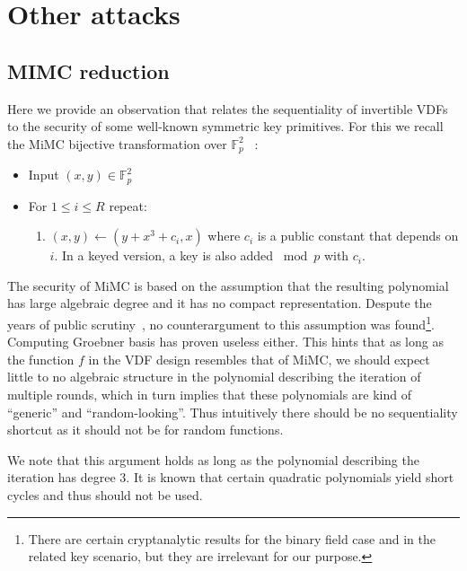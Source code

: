\documentclass{article}
\begin{document}


\section{Other attacks}


\subsection{MIMC reduction}

Here we provide an observation that relates the sequentiality of invertible VDFs to the security of some well-known symmetric key primitives. For this we recall the MiMC bijective transformation over $\mathbb{F}_p^2$ ~\cite{DBLP:conf/asiacrypt/Albrecht0R0T16}:
\begin{itemize}
\item Input $(x,y)\in\mathbb{F}_p^2$
    \item For $1\leq i \leq R$ repeat:
    \begin{enumerate}
        \item $(x,y)\leftarrow (y+x^3+c_i,x)$ where $c_i$ is a public constant that depends on $i$. In a keyed version, a key is also added $\bmod{p}$ with $c_i$.
    \end{enumerate}
\end{itemize}
The security of MiMC is based on the assumption that the resulting polynomial has large algebraic degree and it has no compact representation.
Despute the years of public scrutiny~\cite{DBLP:conf/asiacrypt/AlbrechtC0KLRS19,DBLP:conf/asiacrypt/Eichlseder0LORS20}, no counterargument to this assumption was found\footnote{There are certain cryptanalytic results for the binary field case and in the related key scenario, but they are irrelevant for our purpose.}. Computing Groebner basis has proven useless either. This hints that as long as the function $f$ in the VDF design resembles that of MiMC, we should expect little to no algebraic structure in the polynomial describing the iteration of multiple rounds, which in turn implies that these polynomials are kind of ``generic'' and ``random-looking''. Thus intuitively there should be no sequentiality shortcut as it should not be for random functions. 


We note that this argument holds as long as the polynomial describing the iteration has degree 3. It is known that certain quadratic polynomials yield short cycles and thus should not be used\cite{DBLP:journals/dm/VasigaS04}.
\end{document}
